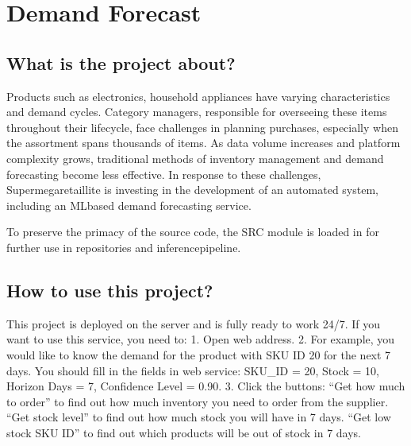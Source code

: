 \documentclass[letterpaper,10pt,english]{sphinxmanual}
\begin{document}
\chapter{Demand Forecast}
\label{\detokenize{index:demand-forecast}}

\section{What is the project about?}
\label{\detokenize{index:what-is-the-project-about}}
\sphinxAtStartPar
Products such as electronics, household appliances have varying characteristics and demand cycles. Category managers, responsible for overseeing these items throughout their lifecycle, face challenges in planning purchases, especially when the assortment spans thousands of items. As data volume increases and platform complexity grows, traditional methods of inventory management and demand forecasting become less effective. In response to these challenges, Supermegaretaillite is investing in the development of an automated system, including an ML\sphinxhyphen{}based demand forecasting service.

\sphinxAtStartPar
To preserve the primacy of the source code, the SRC module is loaded in  for further use in repositories  and inference\sphinxhyphen{}pipeline.


\section{How to use this project?}
\label{\detokenize{index:how-to-use-this-project}}
\sphinxAtStartPar
This project is deployed on the server and is fully ready to work 24/7.
If you want to use this service, you need to:
1. Open  web address.
2. For example, you would like to know the demand for the product with SKU ID 20 for the next 7 days. You should fill in the fields in web service: SKU\_ID = 20, Stock = 10, Horizon Days = 7, Confidence Level = 0.90.
3. Click the buttons:
\sphinxhyphen{} “Get how much to order” to find out how much inventory you need to order from the supplier.
\sphinxhyphen{} “Get stock level” to find out how much stock you will have in 7 days.
\sphinxhyphen{} “Get low stock SKU ID” to find out which products will be out of stock in 7 days.
\end{document}
